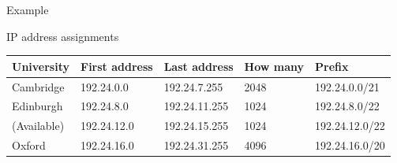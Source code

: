 \begin{frame}{Example}
  \begin{center}
  \end{center}
  \vspace*{1em}
  \begin{block}{IP address assignments}{\scriptsize\ttfamily
      \begin{tabular}{lllll}\toprule
        \textrm{University}&\textrm{First address}&\textrm{Last address}&\textrm{How many}&\textrm{Prefix}\\\midrule
        Cambridge&192.24.0.0&192.24.7.255&2048&192.24.0.0/21\\
        Edinburgh&192.24.8.0&192.24.11.255&1024&192.24.8.0/22\\
        (Available)&192.24.12.0&192.24.15.255&1024&192.24.12.0/22\\
        Oxford&192.24.16.0&192.24.31.255&4096&192.24.16.0/20\\\bottomrule
      \end{tabular}}
  \end{block}
\end{frame}
